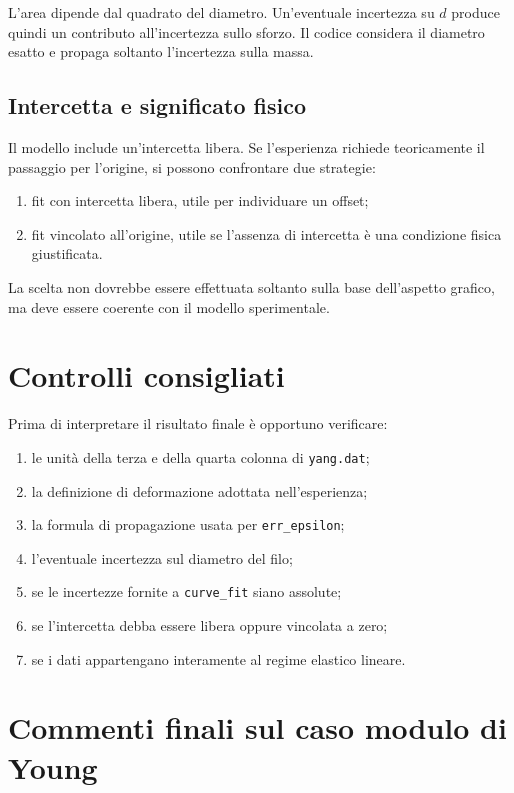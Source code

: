 \documentclass[11pt,a4paper]{book}
\begin{document}
L'area dipende dal quadrato del diametro. Un'eventuale incertezza su $d$ produce quindi un contributo all'incertezza sullo sforzo. Il codice considera il diametro esatto e propaga soltanto l'incertezza sulla massa.

\subsection{Intercetta e significato fisico}

Il modello include un'intercetta libera. Se l'esperienza richiede teoricamente il passaggio per l'origine, si possono confrontare due strategie:

\begin{enumerate}
    \item fit con intercetta libera, utile per individuare un offset;
    \item fit vincolato all'origine, utile se l'assenza di intercetta è una condizione fisica giustificata.
\end{enumerate}

La scelta non dovrebbe essere effettuata soltanto sulla base dell'aspetto grafico, ma deve essere coerente con il modello sperimentale.

\section{Controlli consigliati}

Prima di interpretare il risultato finale è opportuno verificare:

\begin{enumerate}
    \item le unità della terza e della quarta colonna di \texttt{yang.dat};
    \item la definizione di deformazione adottata nell'esperienza;
    \item la formula di propagazione usata per \texttt{err\_epsilon};
    \item l'eventuale incertezza sul diametro del filo;
    \item se le incertezze fornite a \texttt{curve\_fit} siano assolute;
    \item se l'intercetta debba essere libera oppure vincolata a zero;
    \item se i dati appartengano interamente al regime elastico lineare.
\end{enumerate}

\section{Commenti finali sul caso modulo di Young}
\end{document}
